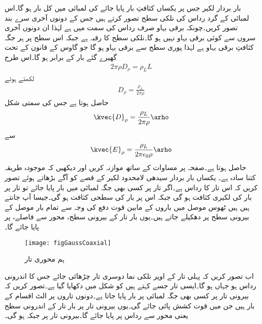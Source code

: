 بار بردار لکیر جس پر یکساں کثافتِ بار  پایا جائے  کی لمبائی  میں کل بار  ہو گا۔اس لمبائی کے گرد  رداس کی نلکی سطح تصور کرتے ہیں جس کے دونوں آخری سرے بند تصور کریں۔چونکہ برقی بہاو صرف رداس کی سمت میں ہے لہٰذا ان دونوں آخری سروں سے کوئی برقی بہاو نہیں ہو گا۔نلکی سطح کا رقبہ  ہے جبکہ اس سطح پر ہر جگہ کثافتِ برقی بہاو   ہے لہٰذا پوری سطح سے  برقی بہاو ہو گا جو گاوس کے قانون کے تحت گھیرے گئے بار  کے برابر ہو گا۔اس طرح
\begin{align*}
2 \pi \rho D_{\rho} = \rho_L L
\end{align*}
لکھتے ہوئے
\begin{align*}
D_{\rho}=\frac{\rho_L}{2\pi \rho}
\end{align*}
حاصل ہوتا ہے جس کی سمتی شکل
\begin{align}\label{مساوات_گاوس_لکیری_کثافت_کا_میدان}
\kvec{D}_\rho=\frac{\rho_L}{2\pi \rho} \arho
\end{align}
سے 
\begin{align}\label{مساوات_گاوس_لکیری_بار_کا_میدان}
\kvec{E}_\rho=\frac{\rho_L}{2\pi \epsilon_0\rho} \arho
\end{align}
حاصل ہوتا ہے۔صفحہ  پر مساوات  کے ساتھ موازنہ کریں اور دیکھیں کہ موجودہ طریقہ کتنا سادہ ہے۔
یکساں بار بردار سیدھی لامحدود لکیر کے قصے کو آگے بڑھاتے ہوئے تصور کریں کہ اس تار کا رداس  ہے۔اگر تار پر کسی بھی  جگہ  لمبائی میں  بار پایا جائے تو تار پر بار کی لکیری کثافت   ہو گی جبکہ اس پر بار کی سطحی کثافت  ہو گی۔جیسا آپ جانتے ہیں ہیں ٹھوس موصل میں باروں کے مابین قوت دفع کی وجہ سے تمام  بار موصل کے بیرونی سطح پر دھکیلے جاتے ہیں۔یوں بار  تار  کے  بیرونی سطح، محور سے  فاصلے، پر پایا جائے گا۔

\begin{figure}
\centering
\texttt{[image: figGaussCoaxial]}
\caption{ہم محوری تار}
\label{شکل_گاوس_ہم_محوری_تار}
\end{figure}

اب تصور کریں کہ پہلی تار کے اوپر نلکی نما دوسری تار چڑھائی جائے جس کا اندرونی رداس  ہو جہاں  ہو گا۔ایسی تار جسے  کہتے ہیں کو شکل  میں دکھایا گیا ہے۔تصور کریں کہ بیرونی تار پر کسی بھی جگہ  لمبائی پر  بار پایا جاتا ہے۔دونوں تاروں پر الٹ اقسام کے بار ہیں جن میں قوت کشش پائی جائے گی۔یوں بیرونی تار پر بار تار کے اندرونی سطح یعنی محور سے  رداس پر پایا جائے گا۔بیرونی تار پر  جبکہ  ہو گی۔

